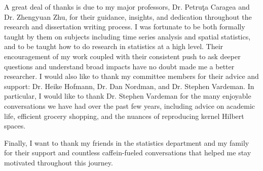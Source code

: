 A great deal of thanks is due to my major professors, Dr. Petru\c{t}a Caragea and Dr. Zhengyuan Zhu, for their guidance, insights, and dedication throughout the research and dissertation writing process. I was fortunate to be both formally taught by them on subjects including time series analysis and spatial statistics, and to be taught how to do research in statistics at a high level. Their encouragement of my work coupled with their consistent push to ask deeper questions and understand broad impacts have no doubt made me a better researcher. I would also like to thank my committee members for their advice and support: Dr. Heike Hofmann, Dr. Dan Nordman, and Dr. Stephen Vardeman. In particular, I would like to thank Dr. Stephen Vardeman for the many enjoyable conversations we have had over the past few years, including advice on academic life, efficient grocery shopping, and the nuances of reproducing kernel Hilbert spaces. 

Finally, I want to thank my friends in the statistics department and my family for their support and countless caffein-fueled conversations that helped me stay motivated throughout this journey. 

